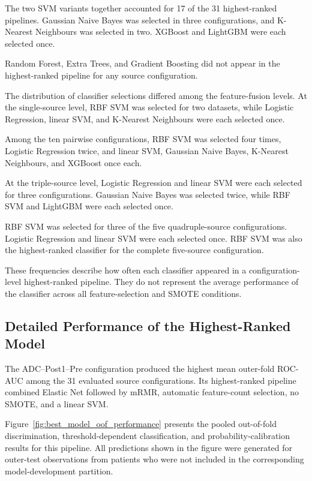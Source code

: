 \documentclass[12pt,twocolumn]{article}
\begin{document}
The two SVM variants together accounted for 17 of the 31
highest-ranked pipelines. Gaussian Naive Bayes was selected in three
configurations, and K-Nearest Neighbours was selected in two.
XGBoost and LightGBM were each selected once.

Random Forest, Extra Trees, and Gradient Boosting did not appear in
the highest-ranked pipeline for any source configuration.

The distribution of classifier selections differed among the
feature-fusion levels. At the single-source level, RBF SVM was
selected for two datasets, while Logistic Regression, linear SVM, and
K-Nearest Neighbours were each selected once.

Among the ten pairwise configurations, RBF SVM was selected four
times, Logistic Regression twice, and linear SVM, Gaussian Naive
Bayes, K-Nearest Neighbours, and XGBoost once each.

At the triple-source level, Logistic Regression and linear SVM were
each selected for three configurations. Gaussian Naive Bayes was
selected twice, while RBF SVM and LightGBM were each selected once.

RBF SVM was selected for three of the five quadruple-source
configurations. Logistic Regression and linear SVM were each selected
once. RBF SVM was also the highest-ranked classifier for the complete
five-source configuration.

These frequencies describe how often each classifier appeared in a
configuration-level highest-ranked pipeline. They do not represent
the average performance of the classifier across all
feature-selection and SMOTE conditions.





\subsection{Detailed Performance of the Highest-Ranked Model}
\label{subsec:best_model_results}

The ADC--Post1--Pre configuration produced the highest mean
outer-fold ROC-AUC among the 31 evaluated source configurations. Its
highest-ranked pipeline combined Elastic Net followed by mRMR,
automatic feature-count selection, no SMOTE, and a linear SVM.

Figure~\ref{fig:best_model_oof_performance} presents the pooled
out-of-fold discrimination, threshold-dependent classification, and
probability-calibration results for this pipeline. All predictions
shown in the figure were generated for outer-test observations from
patients who were not included in the corresponding model-development
partition.
\end{document}
